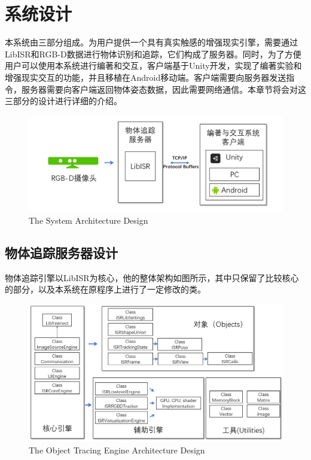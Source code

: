 \chapter{系统设计}
\label{design}

本系统由三部分组成。为用户提供一个具有真实触感的增强现实引擎，需要通过LibISR和RGB-D数据进行物体识别和追踪，它们构成了服务器。同时，为了方便用户可以使用本系统进行编著和交互，客户端基于Unity开发，实现了编著实验和增强现实交互的功能，并且移植在Android移动端。客户端需要向服务器发送指令，服务器需要向客户端返回物体姿态数据，因此需要网络通信。本章节将会对这三部分的设计进行详细的介绍。

\begin{figure}[!htp]
  \centering
  \includegraphics[width=12cm]{figure/TotalArc.png}
    {The System Architecture Design}
 \label{fig:totalarc}
\end{figure}

\section{物体追踪服务器设计}

物体追踪引擎以LibISR为核心\cite{Ren_3DV_2014, star3d_iccv_2013}，他的整体架构如图所示，其中只保留了比较核心的部分，以及本系统在原程序上进行了一定修改的类。

\begin{figure}[!htp]
  \centering
  \includegraphics[width=12cm]{figure/LibArc.png}
    {The Object Tracing Engine Architecture Design}
 \label{fig:labarc}
\end{figure}

